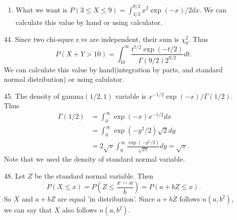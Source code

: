 \documentclass{article}
\begin{document}
\begin{enumerate}
\begin{enumerate}[label = (\alph*)]
			\item What we want is $P(3 \le X \le 9) = \int_{3/2}^{9/2}x^2 \exp(-x)/2 dx$.
				We can calculate this value by hand or using calculator.
		\end{enumerate}

	\item[44.]
		Since two chi-squre r.vs are independent, their sum is $\chi_9^2$.
		Thus
		\[
			P(X + Y > 10) = \int_{10}^\infty\frac{t^{7/2}\exp(-t/2)}{\Gamma(9/2)2^{9/2}}dt.
		\]
		We can calculate this value by hand(integration by parts, and standard normal distribution) or using calulator.

	\item[45.]
		The density of gamma$(1/2, 1)$ variable is $x^{-1/2}\exp(-x)/\Gamma(1/2)$.
		Thus
		\[
			\begin{split}
				\Gamma(1/2) 
				&= \int_0^\infty \exp(-x) x^{-1/2} dx \\
				&= \int_0^\infty \exp(-y^2/2)\sqrt{2} dy\\
				&= 2\sqrt{\pi}\int_0^\infty\frac{\exp(-y^2/2)}{\sqrt{2\pi}}dy = \sqrt{\pi}.
			\end{split}
		\]
		Note that we used the density of standard normal variable.

	\item[48.]
		Let $Z$ be the standard normal variable.
		Then
		\[
			P(X \le x ) = P\left( Z \le \frac{x-a}{b} \right) = P(a+bZ \le x).
		\]
		So $X$ and $a +bZ$ are equal 'in distribution'.
		Since $a +bZ$ follows $n(a, b^2)$, we can say that $X$ also follows $n(a, b^2)$.
\end{enumerate}


\end{document}
